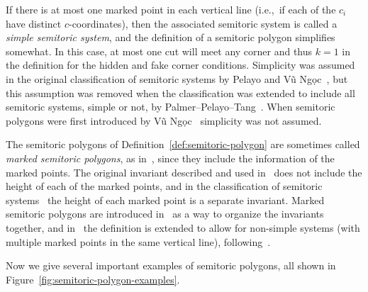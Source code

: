 \documentclass[10pt,a4paper]{amsart}
\numberwithin{equation}{section}
\theoremstyle{definition}
\theoremstyle{plain}
\theoremstyle{plain}
\begin{document}
\begin{Remark}
If there is at most one marked point in each vertical line (i.e.,~if each of the $c_i$ have distinct $c$-coordinates), then the associated semitoric system is called a \emph{simple semitoric system}, and the definition of a semitoric polygon simplifies somewhat. In this case, at most one cut will meet any corner and thus $k=1$ in the definition for the hidden and fake corner conditions.
Simplicity was assumed in the original classification of semitoric systems by Pelayo and V\~{u} Ng\d{o}c~\cite{PeVN2009, PeVN2011}, but this assumption was removed when the classification was extended to include all semitoric systems, simple or not, by Palmer--Pelayo--Tang~\cite{PPT-nonsimple}.
When semitoric polygons were first introduced by V\~{u} Ng\d{o}c~\cite{VN2007} simplicity was not assumed.
\end{Remark}


\begin{Remark}
The semitoric polygons of Definition~\ref{def:semitoric-polygon} are sometimes called \emph{marked semitoric polygons}, as in~\cite{LFPal}, since they include the information of the marked points. The original invariant described and used in~\cite{VN2007} does not include the height of each of the marked points, and in the classification of semitoric systems~\cite{PeVN2009, PeVN2011} the height of each marked point is a separate invariant. Marked semitoric polygons are introduced in~\cite{LFPal}
as a way to organize the invariants together, and in~\cite{HP-extend} the definition is extended to allow for non-simple systems (with multiple marked points in the same vertical line), following~\cite{PPT-nonsimple}.
\end{Remark}

Now we give several important examples of semitoric polygons, all shown in Figure~\ref{fig:semitoric-polygon-examples}.
\end{document}

